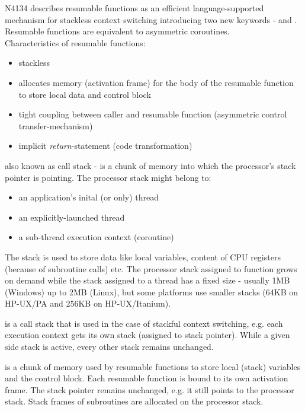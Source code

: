 N4134\cite{N4134} describes resumable functions as an efficient 
language-supported mechanism for stackless context switching introducing two new keywords
- \await and \yield. Resumable functions are equivalent to asymmetric
coroutines.\\
Characteristics of resumable functions:
\begin{itemize}
    \item stackless
    \item allocates memory (activation frame) for the body of the resumable
          function to store local data and control block
    \item tight coupling between caller and resumable function (asymmetric
          control transfer-mechanism)
    \item implicit \emph{return}-statement\cite{N4134} (code transformation)
\end{itemize}

also known as call stack - is a chunk of memory into which the processor's
stack pointer is pointing. The processor stack might belong to:
\begin{itemize}
    \item an application's inital (or only) thread
    \item an explicitly-launched thread
    \item a sub-thread execution context (coroutine)
\end{itemize}

The stack is used to store data like local variables, content of CPU registers
(because of subroutine calls) etc. The processor stack assigned to function
\main grows on demand while the stack assigned to a thread has a fixed size -
usually 1MB (Windows) up to 2MB (Linux), but some platforms use smaller stacks
(64KB on HP-UX/PA and 256KB on HP-UX/Itanium).

is a call stack that is used in the case of stackful context switching, e.g.
each execution context gets its own stack (assigned to stack pointer). While
a given side stack is active, every other stack remains unchanged.

is a chunk of memory used by resumable functions to store local (stack)
variables and the control block. Each resumable function is bound to its own
activation frame. The stack pointer remains unchanged, e.g. it still points to
the processor stack. Stack frames of subroutines are allocated on the 
processor stack.

